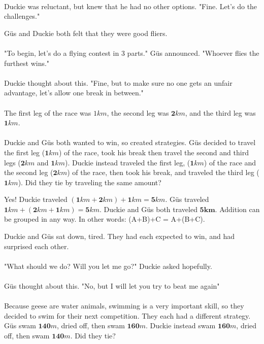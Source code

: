 \paragraph{} Duckie was reluctant, but knew that he had no other options. "Fine. Let's do the challenges."
\vfill
\pagebreak
{}
{G{\"u}s and Duckie both felt that they were good fliers. 
\paragraph{} "To begin, let's do a flying contest in 3 parts." G{\"u}s announced. "Whoever flies the furthest wins."
\paragraph{} Duckie thought about this. "Fine, but to make sure no one gets an unfair advantage, let's allow one break in between."
\paragraph{} The first leg of the race was $1 km$, the second leg was $\mathbf{2} km$, and the third leg was $\mathbf{1} km$. 
\paragraph{} Duckie and G{\"u}s both wanted to win, so created strategies. G{\"u}s decided to travel the first leg ($\mathbf{1} km$) of the race, took his break then travel the second and third legs ($\mathbf{2} km$ and $\mathbf{1} km$). Duckie instead traveled the first leg, ($\mathbf{1} km$) of the race and the second leg ($\mathbf{2} km$) of the race, then took his break, and traveled the third leg ($\mathbf{1} km$). Did they tie by traveling the same amount?}
{Yes! Duckie traveled $(\mathbf{1} km + \mathbf{2} km) + \mathbf{1} km = \mathbf{5} km$. G{\"u}s traveled $\mathbf{1} km + (\mathbf{2} km + \mathbf{1} km) = \mathbf{5}km$. Duckie and G{\"u}s both traveled $\mathbf{5km}$.}
{Addition can be grouped in any way. In other words: (A+B)+C = A+(B+C).}
{}
{Duckie and G{\"u}s sat down, tired. They had each expected to win, and had surprised each other. 
\paragraph{} "What should we do? Will you let me go?" Duckie asked hopefully. \paragraph{} G{\"u}s thought about this. "No, but I will let you try to beat me again" 
\paragraph{} Because geese are water animals, swimming is a very important skill, so they decided to swim for their next competition. They each had a different strategy. G{\"u}s swam $\mathbf{140} m$, dried off, then swam $\mathbf{160} m$. Duckie instead swam $\mathbf{160} m$, dried off, then swam $\mathbf{140} m$. Did they tie?}
